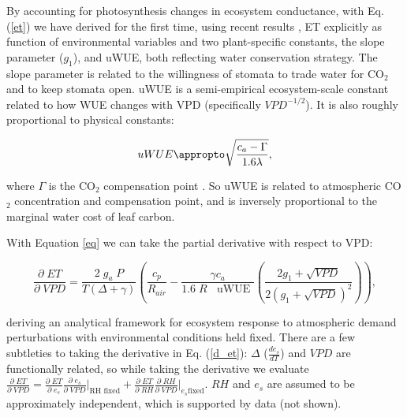 By accounting for photosynthesis changes in ecosystem conductance, with
Eq. (\ref{et}) we have derived for the first time, using recent
results \citep[][]{MEDLYN_2011, Zhou_2014, Zhou_2015, Medlyn_2017}, ET
explicitly as function of environmental variables and two
plant-specific constants, the slope parameter ($g_1$), and uWUE, both
reflecting water conservation strategy. The slope parameter is related
to the willingness of stomata to trade water for CO$_2$ and to keep
stomata open. uWUE is a semi-empirical ecosystem-scale constant
related to how WUE changes with VPD (specifically $VPD^{-1/2}$). It is
also roughly proportional to physical constants:

\[uWUE \appropto \sqrt{\frac{c_a - \Gamma}{1.6 \lambda}},\]

where $\Gamma$ is the CO$_2$ compensation point \citep[Eq. (5)
in][]{Zhou_2014}. So uWUE is related to atmospheric CO$_2$
concentration and compensation point, and is inversely proportional to
the marginal water cost of leaf carbon.


With Equation \ref{eq} we can take the partial derivative with respect
to VPD:

  \begin{equation}
    \frac{\partial \;  ET}{\partial \; VPD} = \frac{2\; g_a \;
      P}{T(\Delta + \gamma)}   \left(\frac{ c_p}{R_{air}} -
      \frac{\gamma c_a }{1.6 \; R\; \; \text{ uWUE }} \left(
        \frac{2 g_1 + \sqrt{VPD}}{2 (g_1 + \sqrt{VPD})^2}\right)
    \right),
    \label{d_et}
  \end{equation}

  deriving an analytical framework for ecosystem response to
  atmospheric demand perturbations with environmental conditions held
  fixed. There are a few subtleties to taking the derivative in
  Eq. (\ref{d_et}): $\Delta$ ($\frac{d e_{s}}{d T}$) and $VPD$ are
  functionally related, so while taking the derivative we evaluate
  $\frac{\partial \; ET}{\partial \; VPD} = \frac{\partial \; ET}
  {\partial \; e_s} \frac{\partial \; e_s}{\partial \; VPD}
  \Big|_{\text{RH fixed}} + \frac{\partial \; ET}{\partial \; RH}
  \frac{\partial \; RH}{\partial \; VPD} \Big|_{\text{$e_s$
      fixed}}$. $RH$ and $e_s$ are assumed to be approximately
  independent, which is supported by data (not shown).

